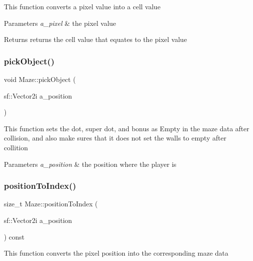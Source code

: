 This function converts a pixel value into a cell value


\begin{DoxyParams}{Parameters}
{\em a\+\_\+pixel} & the pixel value \\
\hline
\end{DoxyParams}
\begin{DoxyReturn}{Returns}
returns the cell value that equates to the pixel value 
\end{DoxyReturn}
\mbox{\label{class_maze_aff24b90af3ab6bd16c94b6831052d3db}} 
\subsubsection{\texorpdfstring{pick\+Object()}{pickObject()}}
{\footnotesize\ttfamily void Maze\+::pick\+Object (\begin{DoxyParamCaption}\item[{sf\+::\+Vector2i}]{a\+\_\+position }\end{DoxyParamCaption})}

This function sets the dot, super dot, and bonus as Empty in the maze data after collision, and also make sures that it does not set the walls to empty after collition


\begin{DoxyParams}{Parameters}
{\em a\+\_\+position} & the position where the player is \\
\hline
\end{DoxyParams}
\mbox{\label{class_maze_abae2881894d0dcc53d179f74cc7aa3bd}} 
\subsubsection{\texorpdfstring{position\+To\+Index()}{positionToIndex()}}
{\footnotesize\ttfamily size\+\_\+t Maze\+::position\+To\+Index (\begin{DoxyParamCaption}\item[{sf\+::\+Vector2i}]{a\+\_\+position }\end{DoxyParamCaption}) const\hspace{0.3cm}{\ttfamily [inline]}}

This function converts the pixel position into the corresponding maze data


